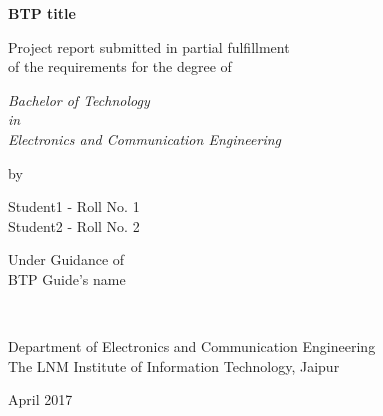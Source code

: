 \thispagestyle{empty}
\begin{center}
{\Large \bf BTP title  }

\vspace*{1.75cm}
{\large Project report submitted in partial fulfillment\\}
{\large  of the requirements for the degree of \\}

\vspace*{1cm}
{\it {\large Bachelor of Technology} \\
{\large in\\}
{\large Electronics and Communication Engineering \\}}

\vspace*{1cm}
{\large by}

\vspace*{1cm}
{\large Student1 - Roll No.  1\\}
{\large Student2 - Roll No.  2 \\}


\vspace*{5mm}
{\large Under Guidance of \\}
{\large BTP Guide's name \\}

\vspace*{1.0cm}
{\\}

\vspace*{2.0cm}
{\large Department of Electronics and Communication Engineering \\}
{\large The LNM Institute of Information Technology, Jaipur\\}

\vspace*{1.0cm}
{\large April 2017\\}
\end{center}


